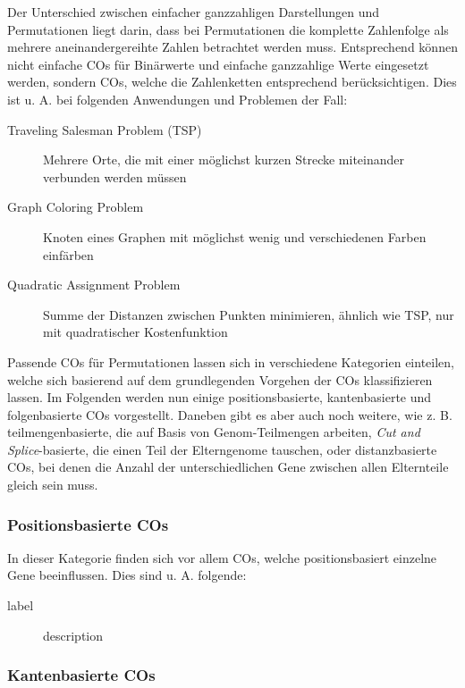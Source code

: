 \documentclass{llncs}
\begin{document}
		Der Unterschied zwischen einfacher ganzzahligen Darstellungen und Permutationen liegt darin, dass bei Permutationen die komplette Zahlenfolge als mehrere aneinandergereihte Zahlen betrachtet werden muss. Entsprechend kön\-nen nicht einfache COs für Binärwerte und einfache ganzzahlige Werte eingesetzt werden, sondern COs, welche die Zahlenketten entsprechend berücksichtigen. Dies ist u. A. bei folgenden Anwendungen und Problemen der Fall:
		\begin{description}
			\item[Traveling Salesman Problem (TSP)] Mehrere Orte, die mit einer möglichst kurzen Strecke miteinander verbunden werden müssen\cite{GAforTSP}
			\item[Graph Coloring Problem] Knoten eines Graphen mit möglichst wenig und verschiedenen Farben einfärben\cite{OrderBasedForGCP}
			\item[Quadratic Assignment Problem] Summe der Distanzen zwischen Punkten minimieren, ähnlich wie TSP, nur mit quadratischer Kostenfunktion\cite{COforQAP}
		\end{description}
	
		Passende COs für Permutationen lassen sich in verschiedene Kategorien einteilen, welche sich basierend auf dem grundlegenden Vorgehen der COs klassifizieren lassen. Im Folgenden werden nun einige positionsbasierte, kantenbasierte und folgenbasierte COs vorgestellt. Daneben gibt es aber auch noch weitere, wie z. B. teilmengenbasierte, die auf Basis von Genom-Teilmengen arbeiten, \textit{Cut and Splice}-basierte, die einen Teil der Elterngenome tauschen, oder distanzbasierte COs, bei denen die Anzahl der unterschiedlichen Gene zwischen allen Elternteile gleich sein muss.
		
		\subsubsection{Positionsbasierte COs}
		
			In dieser Kategorie finden sich vor allem COs, welche positionsbasiert einzelne Gene beeinflussen. Dies sind u. A. folgende:
			
			\begin{description}
				\item[label] description
			\end{description}
		
		\subsubsection{Kantenbasierte COs}
	
\end{document}
